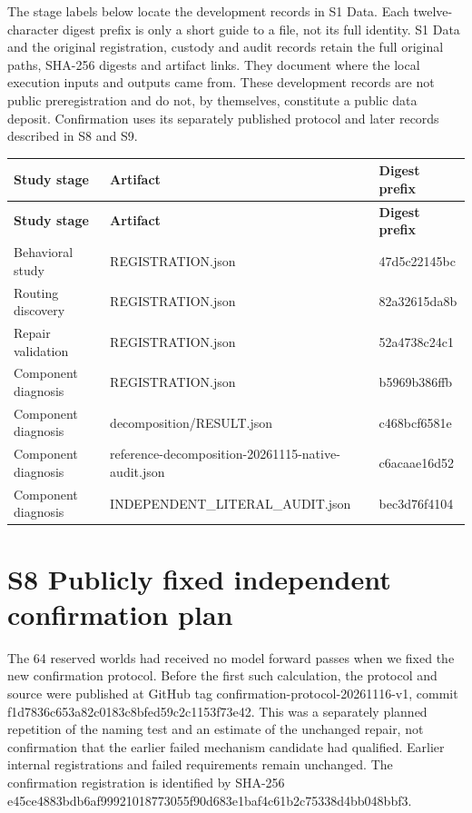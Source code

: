 \documentclass[10pt,letterpaper]{article}
\begin{document}
The stage labels below locate the development records in S1 Data. Each twelve-character digest prefix is only a short guide to a file, not its full identity. S1 Data and the original registration, custody and audit records retain the full original paths, SHA-256 digests and artifact links. They document where the local execution inputs and outputs came from. These development records are not public preregistration and do not, by themselves, constitute a public data deposit. Confirmation uses its separately published protocol and later records described in S8 and S9.


\begingroup\small{}
\begin{longtable}{|>{\raggedright\arraybackslash}p{}|>{\raggedright\arraybackslash}p{}|>{\raggedright\arraybackslash}p{}|}
\hline
\textbf{Study stage} & \textbf{Artifact} & \textbf{Digest prefix}\\\hline
\endfirsthead
\hline
\textbf{Study stage} & \textbf{Artifact} & \textbf{Digest prefix}\\\hline
\endhead
Behavioral study & REGISTRATION.json & 47d5c22145bc\\\hline
Routing discovery & REGISTRATION.json & 82a32615da8b\\\hline
Repair validation & REGISTRATION.json & 52a4738c24c1\\\hline
Component diagnosis & REGISTRATION.json & b5969b386ffb\\\hline
Component diagnosis & decomposition/RESULT.json & c468bcf6581e\\\hline
Component diagnosis & reference-decomposition-20261115-native-audit.json & c6acaae16d52\\\hline
Component diagnosis & INDEPENDENT\_LITERAL\_AUDIT.json & bec3d76f4104\\\hline
\end{longtable}
\endgroup

\section*{S8 Publicly fixed independent confirmation plan}

The 64 reserved worlds had received no model forward passes when we fixed the new confirmation protocol. Before the first such calculation, the protocol and source were published at GitHub tag confirmation-protocol-20261116-v1, commit f1d7836c653a82c0183c8bfed59c2c1153f73e42. This was a separately planned repetition of the naming test and an estimate of the unchanged repair, not confirmation that the earlier failed mechanism candidate had qualified. Earlier internal registrations and failed requirements remain unchanged. The confirmation registration is identified by SHA-256 e45ce4883bdb6af99921018773055f90d683e1baf4c61b2c75338d4bb048bbf3.
\end{document}
